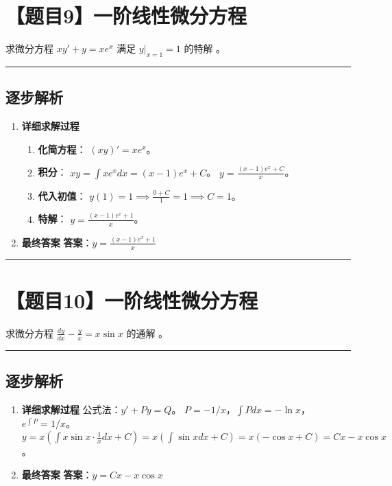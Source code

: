 \documentclass[UTF8]{ctexart}
\newenvironment{redenv}{\color{red}}{}
\newenvironment{detailedanalysis}{%
    \color{red}
    \begin{enumerate}[label=\textbf{第\arabic*步：}, leftmargin=*, align=left, itemsep=1.5ex]
}{%
    \end{enumerate}
}
\newcommand{\problemrule}{\noindent\rule{\textwidth}{1.5pt}\vspace{-0.8em}}
\newcommand{\analysisrule}{\noindent\rule{\textwidth}{0.8pt}\vspace{-0.8em}}
\newcommand{\blank}[1]{\underline{\hspace{#1}}}
\begin{document}
\section*{【题目9】一阶线性微分方程}
求微分方程 $ xy' + y = xe^{x} $ 满足 $ y|_{x=1} = 1 $ 的特解 \blank{2cm}。

\begin{redenv}
\analysisrule
\subsection*{逐步解析}

\begin{detailedanalysis}
\item \textbf{详细求解过程}
\begin{enumerate}[label=(\arabic*)]
\item \textbf{化简方程}：
$(xy)' = xe^x$。
\item \textbf{积分}：
$xy = \int xe^x dx = (x-1)e^x + C$。
$y = \frac{(x-1)e^x + C}{x}$。
\item \textbf{代入初值}：
$y(1) = 1 \implies \frac{0 + C}{1} = 1 \implies C = 1$。
\item \textbf{特解}：
$y = \frac{(x-1)e^x + 1}{x}$。
\end{enumerate}

\item \textbf{最终答案}
\textbf{答案}：$ y = \frac{(x-1)e^x + 1}{x} $
\end{detailedanalysis}
\end{redenv}

\problemrule
\section*{【题目10】一阶线性微分方程}
求微分方程 $ \frac{dy}{dx}-\frac{y}{x}=x\sin x $ 的通解 \blank{2cm}。

\begin{redenv}
\analysisrule
\subsection*{逐步解析}

\begin{detailedanalysis}
\item \textbf{详细求解过程}
公式法：$y' + Py = Q$。
$P = -1/x$，$\int P dx = -\ln x$，$e^{\int P} = 1/x$。
$y = x (\int x \sin x \cdot \frac{1}{x} dx + C) = x (\int \sin x dx + C) = x (-\cos x + C) = C x - x \cos x$。

\item \textbf{最终答案}
\textbf{答案}：$ y = C x - x \cos x $
\end{detailedanalysis}
\end{redenv}
\end{document}
